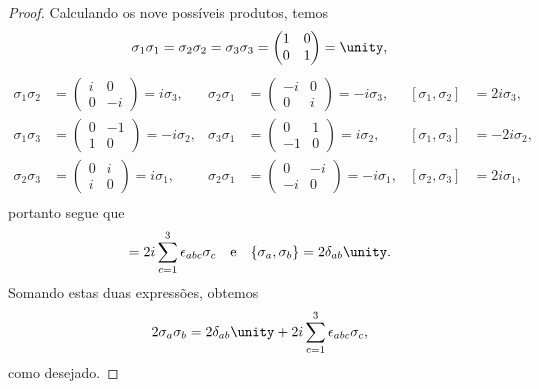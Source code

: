 \begin{proof}
    Calculando os nove possíveis produtos, temos
    \begin{equation*}
        \sigma_1 \sigma_1 = \sigma_2 \sigma_2 = \sigma_3 \sigma_3 = \begin{pmatrix}
            1&0\\0&1
        \end{pmatrix} = \unity,
    \end{equation*}
    \begin{align*}
        \sigma_1 \sigma_2 &= \begin{pmatrix}
            i&0\\0&-i
        \end{pmatrix} = i \sigma_3,&
        \sigma_2 \sigma_1 &= \begin{pmatrix}
            -i&0\\0&i
        \end{pmatrix} = -i \sigma_3,&
            [\sigma_1, \sigma_2] &= 2i \sigma_3,\\
        \sigma_1 \sigma_3 &= \begin{pmatrix}
            0&-1\\1&0
        \end{pmatrix} = -i \sigma_2,&
        \sigma_3 \sigma_1 &= \begin{pmatrix}
            0&1\\-1&0
        \end{pmatrix} = i \sigma_2,&
            [\sigma_1, \sigma_3] &= -2i \sigma_2,\\
        \sigma_2 \sigma_3 &= \begin{pmatrix}
            0&i\\i&0
        \end{pmatrix} = i \sigma_1,&
        \sigma_2 \sigma_1 &= \begin{pmatrix}
            0&-i\\-i&0
        \end{pmatrix} = -i \sigma_1,&
            [\sigma_2, \sigma_3] &= 2i \sigma_1,\\
    \end{align*}
    portanto segue que
    \begin{equation*}
        [\sigma_a, \sigma_b] = 2i \sum_{c=1}^3 \epsilon_{abc}\sigma_c\quad\text{e}\quad\{\sigma_a, \sigma_b\} = 2 \delta_{ab} \unity.
    \end{equation*}
    Somando estas duas expressões, obtemos
    \begin{equation*}
        2\sigma_a \sigma_b = 2 \delta_{ab} \unity + 2i\sum_{c = 1}^3 \epsilon_{abc}\sigma_c,
    \end{equation*}
    como desejado.
\end{proof}

